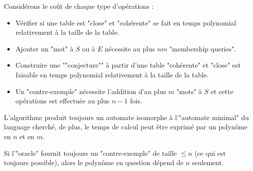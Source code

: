 Considérons le coût de chaque type d'opérations :
\begin{itemize}
	\item Vérifier si une table est "close" et "cohérente" se fait en temps polynomial relativement à la taille de la table.
	\item Ajouter un "mot" à $S$ ou à $E$ nécessite au plus $nm$ "membership queries".
	\item Construire une ""conjecture"" à partir d'une table "cohérente" et "close" est faisable en temps polynomial relativement à
	      la taille de la table.
	\item Un "contre-exemple" nécessite l'addition d'au plus $m$ "mots" à $S$ et cette opérations est effectuée au plus $n-1$ fois.
\end{itemize}

\begin{theorem}
	L'algorithme produit toujours un automate isomorphe à l'"automate minimal" du language cherché, de plus, le temps de calcul peut être
	exprimé par un polynôme en $n$ et en $m$.
\end{theorem}

\begin{remarque}
	Si l'"oracle" fournit toujours un "contre-exemple" de taille $\leq n$ (ce qui est toujours possible), alors le polynôme en question dépend de $n$ seulement.
\end{remarque}

